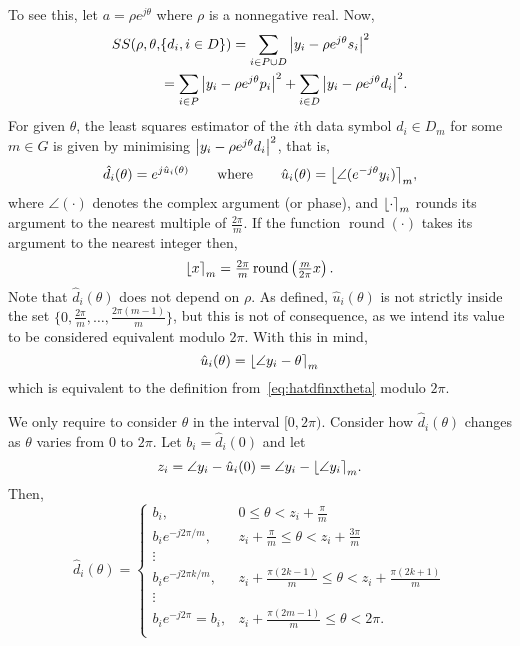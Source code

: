 \documentclass[journal]{IEEEtran}
\begin{document}
To see this, let $a = \rho e^{j\theta}$ where $\rho$ is a nonnegative real.  Now,
\begin{align}
SS(\rho, \theta, &\{d_i, i \in D\}) = \sum_{i \in P \cup D} {\left\vert  y_i - \rho e^{j\theta} s_i  \right\vert}^2  \nonumber \\
&= \sum_{i \in P} {\left\vert  y_i - \rho e^{j\theta} p_i  \right\vert}^2 + \sum_{i \in D} {\left\vert  y_i - \rho e^{j\theta} d_i  \right\vert}^2. \label{eq:SSallparams}
\end{align}
For given $\theta$, the least squares estimator of the $i$th data symbol $d_i \in D_m$ for some $m \in G$ is given by minimising ${\left\vert  y_i - \rho e^{j\theta} d_i  \right\vert}^2$, that is,
\begin{equation}\label{eq:hatdfinxtheta}
\hat{d}_i(\theta) = e^{j\hat{u}_i(\theta)} \qquad \text{where} \qquad \hat{u}_i(\theta) = {\left\lfloor \angle( e^{-j\theta}y_i) \right\rceil}_{m},
\end{equation}
where $\angle(\cdot)$ denotes the complex argument (or phase), and ${\left\lfloor \cdot \right\rceil}_{m}$ rounds its argument to the nearest multiple of $\frac{2\pi}{m}$.  If the function $\operatorname{round}(\cdot)$ takes its argument to the nearest integer then,
\[
{\left\lfloor x \right\rceil}_{m} = \tfrac{2\pi}{m}\operatorname{round}\left(\tfrac{m}{2\pi}x\right).
\] 
Note that $\hat{d}_i(\theta)$ does not depend on $\rho$.  As defined, $\hat{u}_i(\theta)$ is not strictly inside the set $\{0, \tfrac{2\pi}{m}, \dots, \tfrac{2\pi(m-1)}{m}\}$, but this is not of consequence, as we intend its value to be considered equivalent modulo $2\pi$.  With this in mind,
\[
\hat{u}_i(\theta) = {\left\lfloor \angle{y_i} - \theta  \right\rceil}_{m}
\]
which is equivalent to the definition from~\eqref{eq:hatdfinxtheta} modulo $2\pi$.

We only require to consider $\theta$ in the interval $[0, 2\pi)$.  Consider how $\hat{d}_i(\theta)$ changes as $\theta$ varies from $0$ to $2\pi$.  Let $b_i = \hat{d}_i(0)$ and let 
\[
z_i = \angle{y_i} - \hat{u}_i(0) = \angle{y_i} - {\left\lfloor \angle{y_i} \right\rceil}_{m}.
\]
Then,
\begin{equation}\label{eq:uicombos}
\hat{d}_i(\theta) = 
\begin{cases}
b_i, &  0 \leq \theta < z_i + \frac{\pi}{m} \\
b_i e^{-j2\pi/m}, & z_i + \frac{\pi}{m} \leq \theta < z_i + \frac{3\pi}{m} \\ 
\vdots & \\
b_i e^{-j2\pi k /m}, & z_i + \frac{\pi(2k - 1)}{m} \leq \theta < z_i + \frac{\pi(2k + 1)}{m}  \\ 
\vdots & \\
b_i e^{-j2\pi} = b_i, &  z_i + \frac{\pi(2m - 1)}{m} \leq \theta < 2\pi. \\
\end{cases}
\end{equation}
\end{document}

